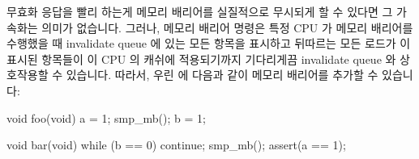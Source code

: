 무효화 응답을 빨리 하는게 메모리 배리어를 실질적으로 무시되게 할 수 있다면 그
가속화는 의미가 없습니다.
그러나, 메모리 배리어 명령은 특정 CPU 가 메모리 배리어를 수행했을 때 invalidate
queue 에 있는 모든 항목을 표시하고 뒤따르는 모든 로드가 이 표시된 항목들이 이
CPU 의 캐쉬에 적용되기까지 기다리게끔 invalidate queue 와 상호작용할 수
있습니다.
따라서, 우린  에 다음과 같이 메모리 배리어를 추가할 수 있습니다:

\iffalse

There is clearly not much point in accelerating invalidation responses
if doing so causes memory barriers to effectively be ignored.
However, the memory-barrier instructions can interact with
the invalidate queue, so that when a given CPU executes a memory
barrier, it marks all the entries currently in its invalidate queue,
and forces any subsequent load to wait until all marked entries
have been applied to the CPU's cache.
Therefore, we can add a memory barrier to function \co{bar} as follows:

\fi

\begin{fcvlabel}
\begin{VerbatimN}[fontsize=\footnotesize,samepage=true,commandchars=\\\[\]]
void foo(void)
{
	a = 1;
	smp_mb();		\lnlbl[mb1]
	b = 1;
}

void bar(void)
{
	while (b == 0) continue;
	smp_mb();
	assert(a == 1);
}
\end{VerbatimN}
\end{fcvlabel}

